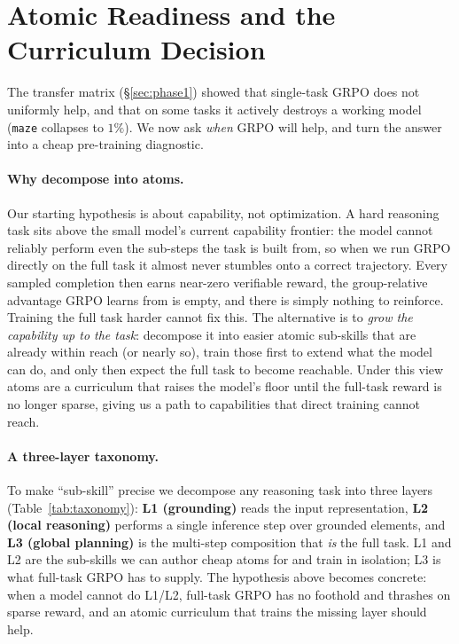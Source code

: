 \documentclass{article}
\begin{document}
\section{Atomic Readiness and the Curriculum Decision}
\label{sec:phase2}
The transfer matrix (\S\ref{sec:phase1}) showed that single-task GRPO does not uniformly help,
and that on some tasks it actively destroys a working model (\texttt{maze} collapses to $1\%$).
We now ask \emph{when} GRPO will help, and turn the answer into a cheap pre-training diagnostic.

\paragraph{Why decompose into atoms.} Our starting hypothesis is about capability, not
optimization. A hard reasoning task sits above the small model's current capability frontier: the
model cannot reliably perform even the sub-steps the task is built from, so when we run GRPO
directly on the full task it almost never stumbles onto a correct trajectory. Every sampled
completion then earns near-zero verifiable reward, the group-relative advantage GRPO learns from
is empty, and there is simply nothing to reinforce. Training the full task harder cannot fix this.
The alternative is to \emph{grow the capability up to the task}: decompose it into easier atomic
sub-skills that are already within reach (or nearly so), train those first to extend what the
model can do, and only then expect the full task to become reachable. Under this view atoms are a
curriculum that raises the model's floor until the full-task reward is no longer sparse, giving us
a path to capabilities that direct training cannot reach.

\paragraph{A three-layer taxonomy.} To make ``sub-skill'' precise we decompose any reasoning task
into three layers (Table~\ref{tab:taxonomy}): \textbf{L1 (grounding)} reads the input
representation, \textbf{L2 (local reasoning)} performs a single inference step over grounded
elements, and \textbf{L3 (global planning)} is the multi-step composition that \emph{is} the full
task. L1 and L2 are the sub-skills we can author cheap atoms for and train in isolation; L3 is
what full-task GRPO has to supply. The hypothesis above becomes concrete: when a model cannot do
L1/L2, full-task GRPO has no foothold and thrashes on sparse reward, and an atomic curriculum that
trains the missing layer should help.
\end{document}
